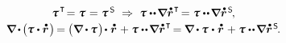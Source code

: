 \nopagebreak\vspace{-0.25em}\begin{equation*}
\begin{array}{c}
\cauchystress^{\hspace{.2ex}\T}\hspace{-0.4ex} = \cauchystress \hspace{.1ex} = \cauchystress^{\hspace{.3ex}\mathsf{S}}
\hspace{.3em}\Rightarrow\hspace{.3em}
\cauchystress \dotdotp \hspace{-0.25ex} \boldnabla \mathdotabove{\currentlocationvector}^{\hspace{.1ex}\T} \hspace{-0.3ex}
=
\cauchystress \dotdotp \hspace{-0.25ex} \boldnabla \mathdotabove{\currentlocationvector}^{\hspace{.2ex}\mathsf{S}}
\hspace{-0.25ex} ,
\\[.25em]
%
\boldnabla \hspace{-0.2ex} \dotp \hspace{-0.2ex} \bigl( \hspace{-0.1ex} \cauchystress \dotp \mathdotabove{\currentlocationvector} \hspace{.15ex} \bigr) \hspace{-0.25ex}
=
\hspace{-0.1ex} \bigl( \boldnabla \hspace{-0.1ex} \dotp \hspace{-0.1ex} \cauchystress \hspace{.16ex} \bigr) \hspace{-0.3ex} \dotp \hspace{.1ex} \mathdotabove{\currentlocationvector} \hspace{.14ex}
+ \cauchystress \dotdotp \hspace{-0.25ex} \boldnabla \mathdotabove{\currentlocationvector}^{\hspace{.1ex}\T} \hspace{-0.3ex}
=
\hspace{-0.12ex} \boldnabla \hspace{-0.1ex} \dotp \hspace{-0.1ex} \cauchystress \hspace{.1ex} \dotp \hspace{.1ex} \mathdotabove{\currentlocationvector} \hspace{.14ex}
+ \cauchystress \dotdotp \hspace{-0.25ex} \boldnabla \mathdotabove{\currentlocationvector}^{\hspace{.2ex}\mathsf{S}}
\hspace{-0.25ex} .
\end{array}
\end{equation*}

